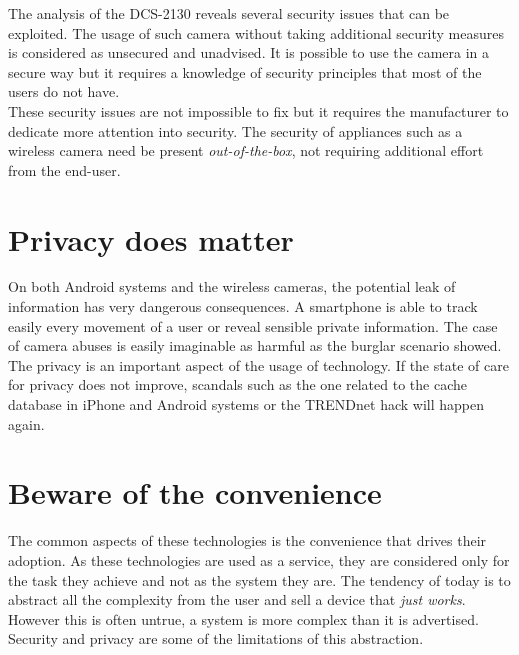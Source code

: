 The analysis of the DCS-2130 reveals several security issues that can be exploited.
The usage of such camera without taking additional security measures is  considered as unsecured and unadvised.
It is possible to use the camera in a secure way but it requires a knowledge of security principles that most of the users do not have.\\

These security issues are not impossible to fix but it requires the manufacturer to dedicate more attention into security.
The security of appliances such as a wireless camera need be present \emph{out-of-the-box}, not requiring additional effort from the end-user.

\section{Privacy does matter}

On both Android systems and the wireless cameras, the potential leak of information has very dangerous consequences.
A smartphone is able to track easily every movement of a user or reveal sensible private information.
The case of camera abuses is easily imaginable as harmful as the burglar scenario showed.\\

The privacy is an important aspect of the usage of technology.
If the state of care for privacy does not improve, scandals such as the one related to the cache database in iPhone and Android systems or the TRENDnet hack will happen again.

\section{Beware of the convenience}

The common aspects of these technologies is the convenience that drives their adoption.
As these technologies are used as a service, they are considered only for the task they achieve and not as the system they are.
The tendency of today is to abstract all the complexity from the user and sell a device that \emph{just works}.
However this is often untrue, a system is more complex than it is advertised.
Security and privacy are some of the limitations of this abstraction.


